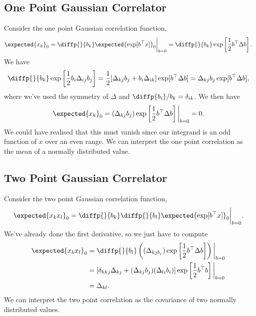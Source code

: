 \documentclass[fleqn]{NotesClass}
\newcommand{\trans}{{\top}}
\begin{document}
    \subsection{One Point Gaussian Correlator}
    Consider the one point Gaussian correlation function,
    \begin{equation}
        \expected{x_k}_0 = \diffp{}{b_k} \expected{\exp[b^\trans x]}_0 \bigg|_{b = 0} = \diffp{}{b_k} \exp\left[ \frac{1}{2}b^\trans \Delta b \right].
    \end{equation}
    We have
    \begin{equation}
        \diffp{}{b_k} \exp\left[ \frac{1}{2}b_i\Delta_{ij}b_j \right] = \frac{1}{2}[\Delta_{kj}b_j + b_i\Delta_{ik}]\exp[b^\trans \Delta b] = \Delta_{kj}b_j \exp[b^\trans \Delta b],
    \end{equation}
    where we've used the symmetry of \(\Delta\) and \(\diffp{b_i}/{b_k} = \delta_{ik}\).
    We then have
    \begin{equation}
        \expected{x_k}_0 = (\Delta_{kj}b_j) \exp\left[ \frac{1}{2}b^\trans \Delta b \right]\bigg|_{b = 0} = 0.
    \end{equation}
    We could have realised that this must vanish since our integrand is an odd function of \(x\) over an even range.
    We can interpret the one point correlation as the mean of a normally distributed value.
    
    \subsection{Two Point Gaussian Correlator}
    Consider the two point Gaussian correlation function,
    \begin{equation}
        \expected{x_kx_l}_{0} = \diffp{}{b_k}\diffp{}{b_l} \expected{\exp[b^\trans x]}_0 \bigg|_{b = 0}.
    \end{equation}
    We've already done the first derivative, so we just have to compute
    \begin{align}
        \expected{x_kx_l}_0 &= \diffp{}{b_l} \left( (\Delta_{kj b_j})\exp\left[ \frac{1}{2}b^\trans \Delta b \right] \right)\bigg|_{b = 0}\\
        &= [\delta_{kkj}\Delta_{kj} + (\Delta_{kj}b_j)(\Delta_{li}b_i)] \exp\left[ \frac{1}{2}b^\trans b \right]\bigg|_{b = 0}\\
        &= \Delta_{kl}.
    \end{align}
    We can interpret the two point correlation as the covariance of two normally distributed values.
    
\end{document}
